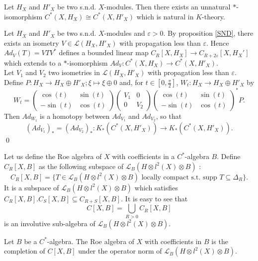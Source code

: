 \begin{prop}
Let $H_X$ and $H'_X$ be two s.n.d. $X$-modules. Then there exists an unnatural $*$-isomorphism $C^*(X,H_X)\cong C^*(X,H'_X)$ which is natural in $K$-theory.
\end{prop}
\begin{dem}
Let $H_X$ and $H'_X$ be two s.n.d. $X$-modules and $\varepsilon>0$. By proposition \ref{SND}, there exists an isometry $V\in\mathcal L(H_X,H'_X)$ with propagation less than $\varepsilon$. Hence $Ad_V(T) = V T V^*$ defines a bounded linear map $C_R[X,H_X]\rightarrow C_{R+2\varepsilon}[X,H_X']$ which extends to a $*$-isomorphism $Ad_V : C^*(X,H_X)\rightarrow C^*(X,H'_X)$.\\

Let $V_1$ and $V_2$ two isometries in $\mathcal L(H_X,H'_X)$ with propagation less than $\varepsilon$. Define $P : H_X\rightarrow H_X\oplus H'_X ; \xi \mapsto \xi \oplus 0$ and, for $t\in [0,\frac{\pi}{2}]$, $W_t : H_X \rightarrow H_X\oplus H'_X$ by 
\[W_t = 
\begin{pmatrix} \cos(t) & \sin (t)\\ -\sin (t) & \cos (t)\end{pmatrix}
\begin{pmatrix} V_1 & 0 \\ 0 & V_2 \end{pmatrix}
\begin{pmatrix} \cos(t) & \sin (t)\\ -\sin (t) & \cos (t)\end{pmatrix}^* P.\] 
Then $Ad_{W_t}$ is a homotopy between $Ad_{V_1}$ and $Ad_{V_2}$, so that 
\[(Ad_{V_1})_* = (Ad_{V_2})_* : K_*(C^*(X,H'_X))\rightarrow K_*(C^*(X,H'_X)).\]
\qed
\end{dem}

Let us define the Roe algebra of $X$ with coefficients in a $C^*$-algebra $B$. Define $C_R[X,B]$ as the following subspace of $\mathcal L_B(H\otimes l^2(X)\otimes B)$ :
\[C_R[X,B] = \{T\in \mathcal L_B(H\otimes l^2(X)\otimes B) \text{ locally compact  s.t. supp }T\subseteq \Delta_R \}.\]
It is a subspace of $\mathcal L_B(H\otimes l^2(X)\otimes B)$ which satisfies $C_R[X,B].C_S[X,B]\subseteq C_{R+S}[X,B]$. It is easy to see that 
\[C[X,B] = \bigcup_{R>0} C_R[X,B]\] 
is an involutive sub-algebra of $\mathcal L_B(H\otimes l^2(X)\otimes B)$.

\begin{definition}
Let $B$ be a $C^*$-algebra. The Roe algebra of $X$ with coefficients in $B$ is the completion of $C[X,B]$ under the operator norm of $\mathcal L_B(H\otimes l^2(X)\otimes B)$. 
\end{definition} 

